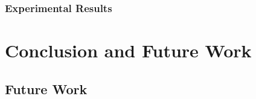 \documentclass[
  a4paper,  %
  twoside,  %
  bibliography=totoc,
  headsepline,
  cleardoublepage=empty,
  parskip=half,
  draft=false
]{scrbook}
\begin{document}
\subsection{Experimental Results}

\chapter{Conclusion and Future Work}
\label{chap:cf}
\section*{Future Work}


\printbibliography

\appendix
%

\pagestyle{empty}
\renewcommand*{\chapterpagestyle}{empty}
\Versicherung
\end{document}
